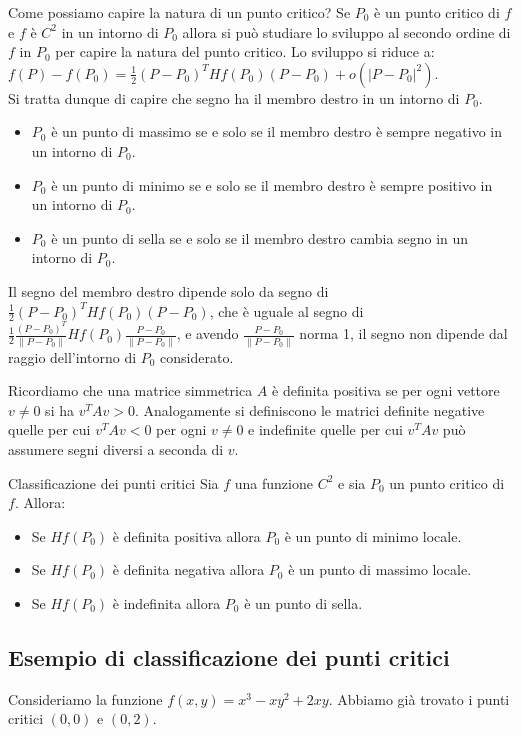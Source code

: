 Come possiamo capire la natura di un punto critico?
Se $P_0$ è un punto critico di $f$ e $f$ è $C^2$ in un intorno di $P_0$ allora si può studiare lo sviluppo al secondo ordine di $f$ in $P_0$ per capire la natura del punto critico. Lo sviluppo si riduce a: $f(P) - f(P_0) = \frac{1}{2} (P - P_0)^T Hf(P_0) (P - P_0) + o(|P - P_0|^2)$.\\
Si tratta dunque di capire che segno ha il membro destro in un intorno di $P_0$.
\begin{itemize}
\item $P_0$ è un punto di massimo se e solo se il membro destro è sempre negativo in un intorno di $P_0$.
\item $P_0$ è un punto di minimo se e solo se il membro destro è sempre positivo in un intorno di $P_0$.
\item $P_0$ è un punto di sella se e solo se il membro destro cambia segno in un intorno di $P_0$.
\end{itemize}
\begin{osservazione}{}
  Il segno del membro destro dipende solo da segno di $\frac{1}{2} (P - P_0)^T Hf(P_0) (P - P_0)$, che è uguale al segno di $\frac{1}{2} \frac{(P - P_0)^T}{\|P - P_0\|} Hf(P_0) \frac{P-P_0}{\|P - P_0\|}$, e avendo $ \frac{P - P_0}{\|P - P_0\|}$ norma 1, il segno non dipende dal raggio dell'intorno di $P_0$ considerato.
\end{osservazione}

Ricordiamo che una matrice simmetrica $A$ è definita positiva se per ogni vettore $v \neq 0$ si ha $v^T A v > 0$. Analogamente si definiscono le matrici definite negative quelle per cui $v^T A v < 0$ per ogni $v \neq 0$ e indefinite quelle per cui $v^T A v$ può assumere segni diversi a seconda di $v$.

\begin{teorema}{Classificazione dei punti critici}
  Sia $f$ una funzione $C^2$ e sia $P_0$ un punto critico di $f$. Allora:
  \begin{itemize}
    \item Se $Hf(P_0)$ è definita positiva allora $P_0$ è un punto di minimo locale.
    \item Se $Hf(P_0)$ è definita negativa allora $P_0$ è un punto di massimo locale.
    \item Se $Hf(P_0)$ è indefinita allora $P_0$ è un punto di sella.
  \end{itemize}
\end{teorema}

\subsection{Esempio di classificazione dei punti critici}
Consideriamo la funzione $f(x,y) = x^3 - xy^2 + 2xy$. Abbiamo già trovato i punti critici $(0,0)$ e $(0,2)$.

